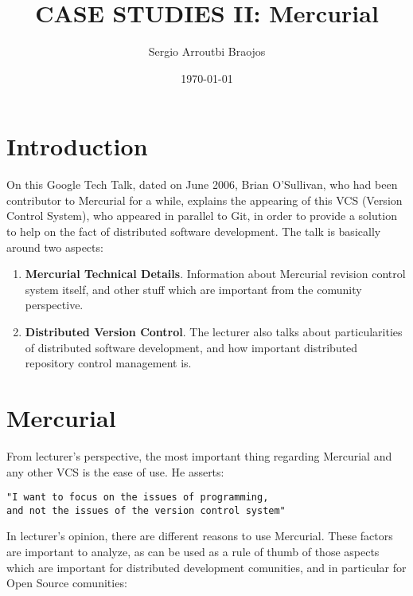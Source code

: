 \documentclass[11pt]{article}
\title{\textbf{CASE STUDIES II: Mercurial}}
\author{Sergio Arroutbi Braojos}
\date{\today}
\begin{document}
\maketitle

\section{Introduction}
On this Google Tech Talk, dated on June 2006, Brian O'Sullivan, who had been contributor to Mercurial for a while, explains the appearing of this VCS (Version Control System), who appeared in parallel to Git, in order to provide a solution to help on the fact of distributed software development. The talk is basically around two aspects:
\begin{enumerate}
\item{\textbf{Mercurial Technical Details}}. Information about Mercurial revision control system itself, and other stuff which are important from the comunity perspective.
\item{\textbf{Distributed Version Control}}. The lecturer also talks about particularities of distributed software development, and how important distributed repository control management is.
\end{enumerate}

\section{Mercurial}
From lecturer's perspective, the most important thing regarding Mercurial and any other VCS is the ease of use. He asserts:

\begin{verbatim}
"I want to focus on the issues of programming, 
and not the issues of the version control system"
\end{verbatim}

In lecturer's opinion, there are different reasons to use Mercurial. These factors are important to analyze, as can be used as a rule of thumb of those aspects which are important for distributed development comunities, and in particular for Open Source comunities:
\end{document}
